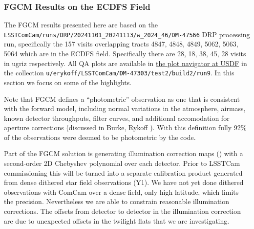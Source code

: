 \subsubsection{FGCM Results on the ECDFS Field}

The FGCM results presented here are based on the
\texttt{LSSTComCam/runs/DRP/20241101\_20241113/w\_2024\_46/DM-47566} DRP processing
run, specifically the 157 visits overlapping tracts
4847, 4848, 4849, 5062, 5063, 5064 which are in the ECDFS field. Specifically there
are 28, 18, 38, 45, 28 visits in ugriz respectively. All QA plots are available
in \href{https://usdf-rsp.slac.stanford.edu/plot-navigator}{the plot navigator at USDF} in
the collection \texttt{u/erykoff/LSSTComCam/DM-47303/test2/build2/run9}.  In this
section we focus on some of the highlights.

Note that FGCM defines a ``photometric'' observation as one that is consistent
with the forward model, including normal variations in the atmosphere, airmass,
known detector throughputs, filter curves, and additional accomodation for
aperture corrections (discussed in Burke, Rykoff \etal).  With this definition
fully 92\% of the observations were deemed to be photometric by the code.


Part of the FGCM solution is generating illumination correction maps ()
with a second-order 2D Chebyshev polynomial over each detector.  Prior to LSSTCam
commissioning this will be turned into a separate calibration product generated
from dense dithered star field observations (Y1).
We have not yet done dithered observations with ComCam over a dense
field, only high latitude, which limits the precision.  Nevertheless we are
able to constrain reasonable illumination corrections.  The offsets from
detector to detector in the illumination correction are due to unexpected
offsets in the twilight flats that we are investigating.

